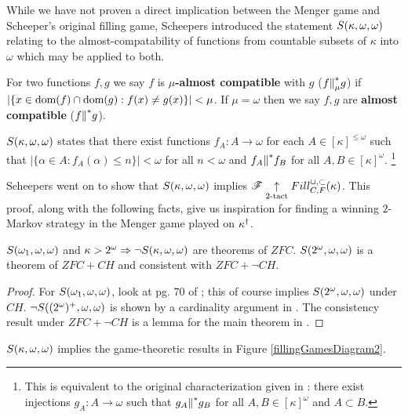 While we have not proven a direct implication between the Menger game and
Scheeper's original filling game, Scheepers introduced the statement
$S(\kappa,\omega,\omega)$ relating to the almost-compatability of functions
from countable subsets of $\kappa$ into $\omega$ which may be applied to
both.

\begin{defn}
  For two functions $f,g$ we say $f$ is \textbf{$\mu$-almost compatible} with
  $g$ ($f{\parallel}^*_\mu g$) if $|\{x\in\textrm{dom}(f)\cap\textrm{dom}(g):f(x)\not=g(x)\}|<\mu$.
  If $\mu=\omega$ then we say $f,g$ are \textbf{almost compatible}
  ($f{\parallel}^* g$).
\end{defn}

\begin{defn}
  $S(\kappa,\omega,\omega)$ states that there exist functions
  $f_A:A\to\omega$ for each $A\in[\kappa]^{\leq\omega}$ such that
  $|\{\alpha\in A:f_A(\alpha)\leq n\}|<\omega$ for all $n<\omega$ and
  $f_A{\parallel}^* f_B$ for all $A,B\in[\kappa]^\omega$.
  \footnote{
  This is equivalent to the original characterization given in
  \cite{MR1129143}: there exist injections $g_A:A\to\omega$
  such that $g_A{\parallel}^* g_B$ for all $A,B\in[\kappa]^\omega$ and $A\subset B$.
  }
\end{defn}

Scheepers went on to show that $S(\kappa,\omega,\omega)$ implies
$\mathscr{F} \underset{2\text{-tact}}{\uparrow} Fill^{\cup,\subset}_{C,F}(\kappa)$. This proof, along with the following
facts, give us inspiration for
finding a winning $2$-Markov strategy in the Menger game played on
$\kappa^\dagger$.

\begin{thm}
  $S(\omega_1,\omega,\omega)$ and $\kappa>2^\omega\Rightarrow\neg S(\kappa,\omega,\omega)$
  are theorems of $ZFC$.
  $S(2^\omega,\omega,\omega)$ is a theorem of $ZFC+CH$ and consistent with
  $ZFC+\neg CH$.
\end{thm}

\begin{proof}
  For $S(\omega_1,\omega,\omega)$, look at pg. 70 of \cite{MR597342}; this of course
  implies $S(2^\omega,\omega,\omega)$ under $CH$.
  $\neg S((2^\omega)^+,\omega,\omega)$ is shown by a cardinality argument
  in \cite{MR1129143}.
  The consistency result under $ZFC+\neg CH$
  is a lemma for the main theorem in \cite{MR1129143}.
\end{proof}

\begin{thm}
  $S(\kappa,\omega,\omega)$ implies the game-theoretic results in
  Figure \ref{fillingGamesDiagram2}.
\end{thm}

